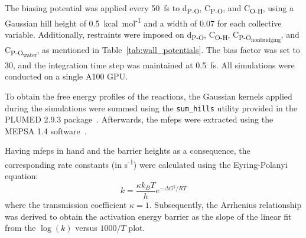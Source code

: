 The biasing potential was applied every 50~fs to d\textsubscript{P-O}, C\textsubscript{P-O}, and C\textsubscript{O-H}, using a Gaussian hill height of 0.5~kcal~mol\textsuperscript{-1} and a width of 0.07 for each collective variable. Additionally, restraints were imposed on d\textsubscript{P-O}, C\textsubscript{O-H}, C\textsubscript{P-O\textsubscript{nonbridging}}, and C\textsubscript{P-O\textsubscript{water}}, as mentioned in Table~\ref{tab:wall_potentials}. The bias factor was set to 30, and the integration time step was maintained at 0.5~fs. All simulations were conducted on a single A100 GPU.

To obtain the free energy profiles of the reactions, the Gaussian kernels applied during the simulations were summed using the \texttt{sum\_hills} utility provided in the PLUMED 2.9.3 package~\citep{tribelloPLUMED2New2014}. Afterwards, the \acp{mfep} were extracted using the MEPSA 1.4 software~\citep{marcos-alcaldeMEPSAMinimumEnergy2015}. 

Having \acp{mfep} in hand and the barrier heights as a consequence, the corresponding rate constants (in s\textsuperscript{-1}) were calculated using the Eyring-Polanyi equation:
\begin{equation}
    k = \frac{\kappa k_B T}{h} e^{-\Delta G^\ddagger / RT}
\end{equation}
where the transmission coefficient $\kappa = 1$. Subsequently, the Arrhenius relationship was derived to obtain the activation energy barrier as the slope of the linear fit from the \(\log(k)\) versus \(1000/T\) plot.












